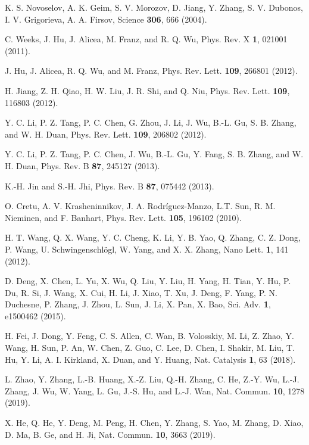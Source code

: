\documentclass[aps,prl,twocolumn,showpacs,superscriptaddress]{revtex4-1}
\begin{document}
\begin{thebibliography}{99}
K. S. Novoselov, A. K. Geim, S. V. Morozov, D. Jiang, Y. Zhang, S. V. Dubonos, I. V. Grigorieva, A. A. Firsov, {Science \textbf{306}, 666 (2004)}.

C. Weeks, J. Hu, J. Alicea, M. Franz, and R. Q. Wu, {Phys. Rev. X \textbf{1}, 021001 (2011)}.

J. Hu, J. Alicea, R. Q. Wu, and M. Franz, {Phys. Rev. Lett. \textbf{109}, 266801 (2012)}.

H. Jiang, Z. H. Qiao, H. W. Liu, J. R. Shi, and Q. Niu, {Phys. Rev. Lett. \textbf{109}, 116803 (2012)}.

Y. C. Li, P. Z. Tang, P. C. Chen, G. Zhou, J. Li, J. Wu, B.-L. Gu, S. B. Zhang, and W. H. Duan, {Phys. Rev. Lett. \textbf{109}, 206802 (2012)}.

Y. C. Li, P. Z. Tang, P. C. Chen, J. Wu, B.-L. Gu, Y. Fang, S. B. Zhang, and W. H. Duan, {Phys. Rev. B \textbf{87}, 245127 (2013)}.

K.-H. Jin and S.-H. Jhi, {Phys. Rev. B \textbf{87}, 075442 (2013)}.

O. Cretu, A. V. Krasheninnikov, J. A. Rodríguez-Manzo, L.T. Sun, R. M. Nieminen, and F. Banhart, {Phys. Rev. Lett. \textbf{105}, 196102 (2010)}.

H. T. Wang, Q. X. Wang, Y. C. Cheng, K. Li, Y. B. Yao, Q. Zhang, C. Z. Dong, P. Wang, U. Schwingenschlögl, W. Yang, and X. X. Zhang, {Nano Lett. \textbf{1}, 141 (2012)}.

D. Deng, X. Chen, L. Yu, X. Wu, Q. Liu, Y. Liu, H. Yang, H. Tian, Y. Hu, P. Du, R. Si, J. Wang, X. Cui, H. Li, J. Xiao, T. Xu, J. Deng, F. Yang, P. N. Duchesne, P. Zhang, J. Zhou, L. Sun, J. Li, X. Pan, X. Bao, {Sci. Adv. \textbf{1}, e1500462 (2015)}.

H. Fei, J. Dong, Y. Feng, C. S. Allen, C. Wan, B. Volosskiy, M. Li, Z. Zhao, Y. Wang, H. Sun, P. An, W. Chen, Z. Guo, C.
Lee, D. Chen, I. Shakir, M. Liu, T. Hu, Y. Li, A. I. Kirkland, X. Duan, and Y. Huang, {Nat. Catalysis \textbf{1}, 63 (2018)}.

L. Zhao, Y. Zhang, L.-B. Huang, X.-Z. Liu, Q.-H. Zhang, C. He, Z.-Y. Wu, L.-J. Zhang, J. Wu, W. Yang, L. Gu, J.-S. Hu, and L.-J. Wan, {Nat. Commun. \textbf{10}, 1278 (2019)}.

X. He, Q. He, Y. Deng, M. Peng, H. Chen, Y. Zhang, S. Yao, M. Zhang, D. Xiao, D. Ma, B. Ge, and H. Ji, {Nat. Commun. \textbf{10}, 3663 (2019)}.


\end{thebibliography}
\end{document}
